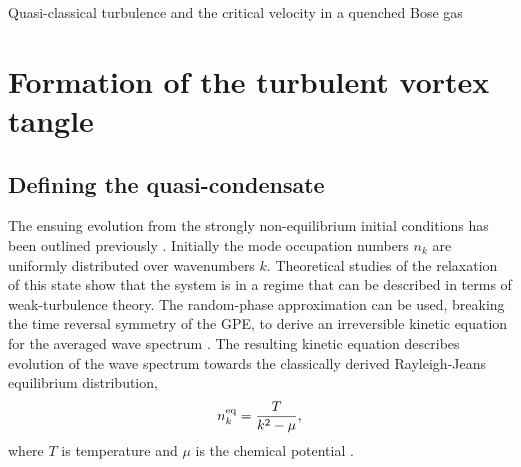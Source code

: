\begin{chapter}{\label{cha:nonequib}Quasi-classical turbulence and the critical velocity in a quenched Bose gas}
\section{Formation of the turbulent vortex tangle}
\subsection{Defining the quasi-condensate}
The ensuing evolution from the strongly non-equilibrium initial conditions has been outlined previously \cite{PhysRevA.66.013603,pattinson_2014}.  Initially the mode occupation numbers $n_k$ are uniformly distributed over wavenumbers $k$. Theoretical studies of the relaxation of this state show that the system is in a regime that can be described in terms of weak-turbulence theory. The random-phase approximation can be used, breaking the time reversal symmetry of the GPE, to derive an irreversible kinetic equation for the averaged wave spectrum \cite{PhysRevLett.95.263901}. The resulting kinetic equation describes evolution of the wave spectrum towards the classically derived Rayleigh-Jeans equilibrium distribution,
\begin{equation}
n^{\rm eq}_k = \frac{T}{k^2-\mu},
\end{equation}
where $T$ is temperature and $\mu$ is the chemical potential \cite{Newell01}.


\end{chapter}
